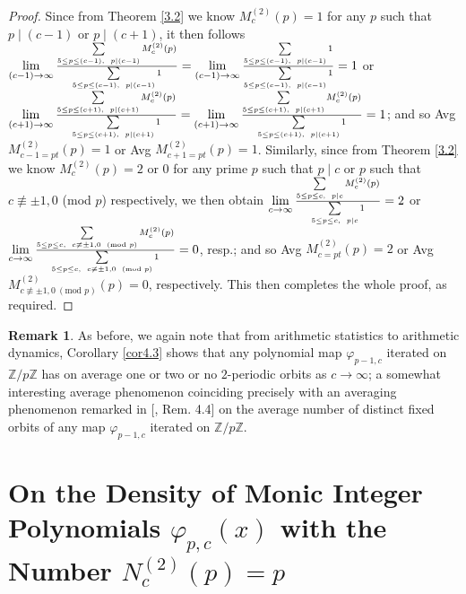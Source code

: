 \documentclass{article}
\theoremstyle{plain}
\theoremstyle{definition}
\newtheorem{rem}[thm]{Remark}
\begin{document}
\begin{proof}
Since from Theorem \ref{3.2} we know $M_{c}^{(2)}(p) = 1$ for any $p$ such that $p\mid (c-1)$ or $p\mid (c+1)$, it then follows  $\lim\limits_{(c-1)\to\infty} \Large{\frac{\sum\limits_{5\leq p\leq (c-1), \ p\mid (c-1)}M_{c}^{(2)}(p)}{\Large{\sum\limits_{5\leq p\leq (c-1), \ p\mid (c-1)}1}}} = \lim\limits_{(c-1)\to\infty} \Large{\frac{\sum\limits_{5\leq p\leq (c-1), \ p\mid (c-1)}1}{\Large{\sum\limits_{5\leq p\leq (c-1), \ p\mid (c-1)}1}}} = 1$ or $\lim\limits_{(c+1)\to\infty} \Large{\frac{\sum\limits_{5\leq p\leq (c+1), \ p\mid (c+1)}M_{c}^{(2)}(p)}{\Large{\sum\limits_{5\leq p\leq (c+1), \ p\mid (c+1)}1}}} = \lim\limits_{(c+1)\to\infty} \Large{\frac{\sum\limits_{5\leq p\leq (c+1), \ p\mid (c+1)}M_{c}^{(2)}(p)}{\Large{\sum\limits_{5\leq p\leq (c+1), \ p\mid (c+1)}1}}} = 1$; and so Avg $M^{(2)}_{c-1 = pt}(p) = 1$ or Avg $M^{(2)}_{c+1 = pt}(p) = 1$. Similarly, since from Theorem \ref{3.2} we know $M_{c}^{(2)}(p) = 2$ or $0$ for any prime $p$ such that $p\mid c$ or $p$ such that $c\not \equiv \pm1, 0$ (mod $p$) respectively, we then obtain $\lim\limits_{c\to\infty} \Large{\frac{\sum\limits_{5\leq p\leq c, \ p\mid c}M_{c}^{(2)}(p)}{\Large{\sum\limits_{5\leq p\leq c, \ p\mid c}1}}} = 2$ or $\lim\limits_{c\to\infty} \Large{\frac{\sum\limits_{5\leq p\leq c, \ c\not \equiv\pm1, 0 \ (\text{mod } p)}M_{c}^{(2)}(p)}{\Large{\sum\limits_{5\leq p\leq c, \ c\not \equiv\pm1, 0 \ (\text{mod } p)}1}}} = 0$, resp.; and so Avg $M^{(2)}_{c = pt}(p) = 2$ or Avg $M_{c\not \equiv\pm1, 0 \ (\text{mod }p)}^{(2)}(p) = 0$, respectively. This then completes the whole proof, as required.
\end{proof} 
\begin{rem} \label{re4.4}
As before, we again note that from arithmetic statistics to arithmetic dynamics, Corollary \ref{cor4.3} shows that any polynomial map $\varphi_{p-1,c}$ iterated on $\mathbb{Z} / p\mathbb{Z}$ has on average one or two or no $2$-periodic orbits as $c\to \infty$; a somewhat interesting average phenomenon coinciding precisely with an averaging phenomenon remarked in [\cite{BK1}, Rem. 4.4] on the average number of distinct fixed orbits of any map $\varphi_{p-1,c}$ iterated on $\mathbb{Z} / p\mathbb{Z}$.
\end{rem}


\section{On the Density of Monic Integer Polynomials $\varphi_{p,c}(x)$ with the Number $N^{(2)}_{c}(p) = p$}\label{sec5}
\end{document}
